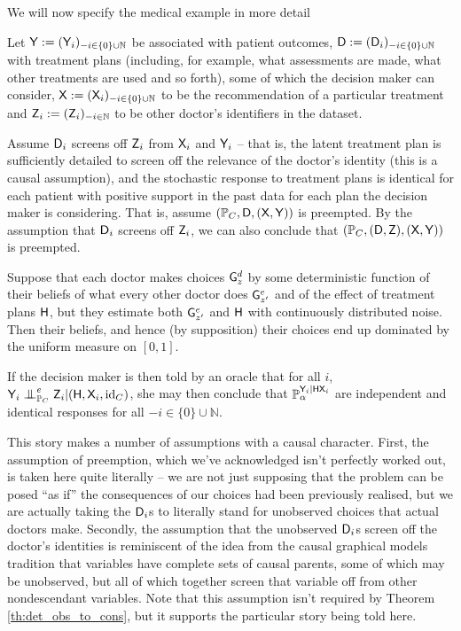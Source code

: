 We will now specify the medical example in more detail
\begin{example}\label{ex:doctor_detailed}
Let $\mathsf{Y}:=(\mathsf{Y}_i)_{-i\in \{0\}\cup\mathbb{N}}$ be associated with patient outcomes, $\mathsf{D}:=(\mathsf{D}_i)_{-i\in \{0\}\cup\mathbb{N}}$ with treatment plans (including, for example, what assessments are made, what other treatments are used and so forth), some of which the decision maker can consider, $\mathsf{X}:=(\mathsf{X}_i)_{-i\in \{0\}\cup\mathbb{N}}$ to be the recommendation of a particular treatment and $\mathsf{Z}_i:= (\mathsf{Z}_i)_{-i\in \mathbb{N}}$ to be other doctor's identifiers in the dataset.

Assume $\mathsf{D}_i$ screens off $\mathsf{Z}_i$ from $\mathsf{X}_i$ and $\mathsf{Y}_i$ -- that is, the latent treatment plan is sufficiently detailed to screen off the relevance of the doctor's identity (this is a causal assumption), and the stochastic response to treatment plans is identical for each patient with positive support in the past data for each plan the decision maker is considering. That is, assume $(\mathbb{P}_C,\mathsf{D},(\mathsf{X},\mathsf{Y}))$ is preempted. By the assumption that $\mathsf{D}_i$ screens off $\mathsf{Z}_i$, we can also conclude that $(\mathbb{P}_C,(\mathsf{D},\mathsf{Z}),(\mathsf{X},\mathsf{Y}))$ is preempted.

Suppose that each doctor makes choices $\mathsf{G}^d_z$ by some deterministic function of their beliefs of what every other doctor does $\mathsf{G}^e_{z'}$ and of the effect of treatment plans $\mathsf{H}$, but they estimate both $\mathsf{G}^e_{z'}$ and $\mathsf{H}$ with continuously distributed noise. Then their beliefs, and hence (by supposition) their choices end up dominated by the uniform measure on $[0,1]$.

If the decision maker is then told by an oracle that for all $i$, $\RV{Y}_i\CI^e_{\prob{P}_C} \RV{Z}_i|(\RV{H},\RV{X}_i,\text{id}_C)$, she may then conclude that $\mathbb{P}_\alpha^{\mathsf{Y}_i|\mathsf{H}\mathsf{X}_i}$ are independent and identical responses for all $-i\in\{0\}\cup\mathbb{N}$.
\end{example}

This story makes a number of assumptions with a causal character. First, the assumption of preemption, which we've acknowledged isn't perfectly worked out, is taken here quite literally -- we are not just supposing that the problem can be posed ``as if'' the consequences of our choices had been previously realised, but we are actually taking the $\mathsf{D}_i$s to literally stand for unobserved choices that actual doctors make. Secondly, the assumption that the unobserved $\mathsf{D}_i$s screen off the doctor's identities is reminiscent of the idea from the causal graphical models tradition that variables have complete sets of causal parents, some of which may be unobserved, but all of which together screen that variable off from other nondescendant variables. Note that this assumption isn't required by Theorem \ref{th:det_obs_to_cons}, but it supports the particular story being told here.


